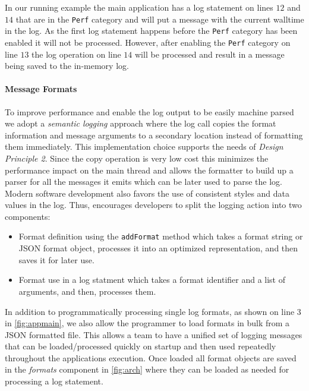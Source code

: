 In our running example the main application has a log statement on lines $12$ and $14$ 
that are in the \texttt{Perf} category and will put a message with the current walltime 
in the log. As the first log statement happens before the \texttt{Perf} category has 
been enabled it will not be processed. However, after enabling the \texttt{Perf} category 
on line $13$ the log operation on line $14$ will be processed and result in a message 
being saved to the in-memory log.

\paragraph{Message Formats}
\noindent
To improve performance and enable the log output to be easily machine parsed we 
adopt a \emph{semantic logging} approach where the log call copies the format 
information and message arguments to a secondary location instead of formatting them 
immediately. This implementation choice supports the needs of \emph{Design Principle 2}.
Since the copy operation is very low cost this minimizes the 
performance impact on the main thread and allows the formatter to build up a 
parser for all the messages it emits which can be later used to parse the log. 
Modern software development also favors the use of consistent styles and data 
values in the log. Thus, \projn encourages developers to split the logging 
action into two components:
\begin{itemize}
\item Format definition using the \texttt{addFormat} method which takes a format 
string or JSON format object, processes it into an optimized representation, 
and then saves it for later use.
\item Format use in a log statment which takes a format identifier and a list of 
arguments, and then, processes them.
\end{itemize}

In addition to programmatically processing single log formats, as shown on line 3 
in \autoref{fig:appmain}, we also allow the programmer to load formats in bulk 
from a JSON formatted file. This allows a team to have a unified set of logging 
messages that can be loaded/processed quickly on startup and then used repeatedly 
throughout the applications execution. Once loaded all format objects are saved 
in the \emph{formats} component in \autoref{fig:arch} where they can be loaded 
as needed for processing a log statement.\\

